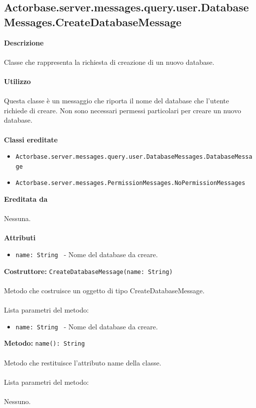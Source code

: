 \documentclass[a4paper]{article}
\begin{document}
	\subsection{Actorbase.server.messages.query.user.DatabaseMessages.CreateDatabaseMessage}
		\textbf{Descrizione}
			\\ \\
		Classe che rappresenta la richiesta di creazione di un nuovo database.
			\\ \\
		\textbf{Utilizzo}
			\\ \\
		Questa classe è un messaggio che riporta il nome del database che l'utente richiede di creare.
		Non sono necessari permessi particolari per creare un nuovo database.
			\\ \\
		\textbf{Classi ereditate}
			\begin{itemize}
				\item \texttt{Actorbase.server.messages.query.user.DatabaseMessages.DatabaseMessage }
				\item \texttt{Actorbase.server.messages.PermissionMessages.NoPermissionMessages }
			\end{itemize}
		\textbf{Ereditata da}
			\\ \\
			Nessuna.
			\\ \\
		\textbf{Attributi}
			\begin{itemize}
				\item \texttt{name: String } - Nome del database da creare.
			\end{itemize}
		\textbf{Costruttore: }\texttt{CreateDatabaseMessage(name: String)}
			\\ \\
		Metodo che costruisce un oggetto di tipo CreateDatabaseMessage.
			\\ \\
		Lista parametri del metodo:
			\begin{itemize}
				\item \texttt{name: String } - Nome del database da creare.
			\end{itemize}
		\textbf{Metodo: }\texttt{name(): String}
			\\ \\
		Metodo che restituisce l'attributo name della classe.
			\\ \\
		Lista parametri del metodo:
			\\ \\
			Nessuno.		
			
\end{document}
